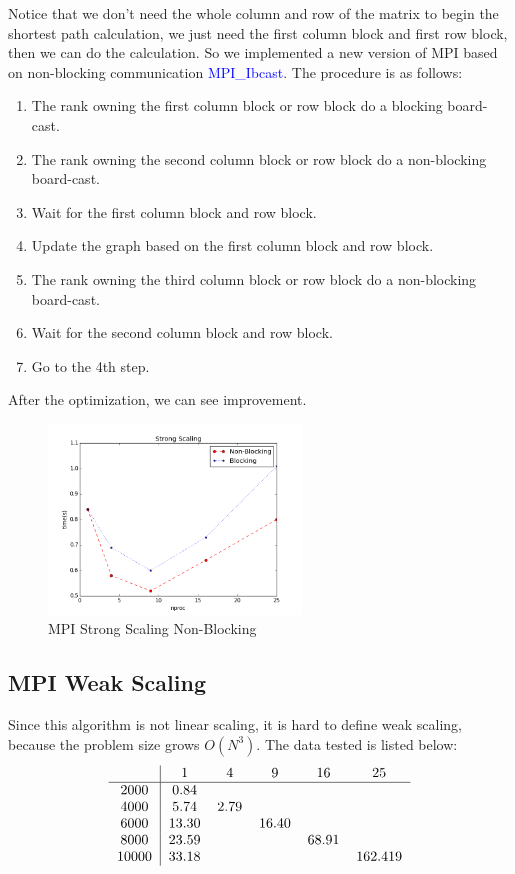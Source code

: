 Notice that we don't need the whole column and row of the matrix to begin the shortest path calculation, we just need the first
column block and first row block, then we can do the calculation. So we implemented a new version of MPI based on non-blocking
communication \textcolor{blue}{MPI\_Ibcast}. The procedure is as follows:
\begin{enumerate}
\item The rank owning the first column block or row block do a blocking board-cast.
\item The rank owning the second column block or row block do a non-blocking board-cast.
\item Wait for the first column block and row block.
\item Update the graph based on the first column block and row block.
\item The rank owning the third column block or row block do a non-blocking board-cast.
\item Wait for the second column block and row block.
\item Go to the 4th step.
\end{enumerate}

After the optimization, we can see improvement.
\begin{figure}[H]
    \centering
    \includegraphics[width=0.6\textwidth]{figs/strong_scaling.png}
    \caption{MPI Strong Scaling Non-Blocking}
\end{figure}

\subsection{MPI Weak Scaling}
Since this algorithm is not linear scaling, it is hard to define weak scaling, because the problem size grows $O(N^{3})$.
The data tested is listed below:
\begin{equation*}
\begin{tabular}{c|ccccc}
      & 1      & 4 & 9 & 16 & 25       \\
\hline 
2000  & 0.84   &   &   &    &          \\
4000  & 5.74  &  2.79 &   &   &       \\
6000  & 13.30  &   &  16.40 &    &     \\
8000  & 23.59   &   &   &  68.91  &    \\
10000 & 33.18   &   &   &    &  162.419  \\
\end{tabular}
\end{equation*}

